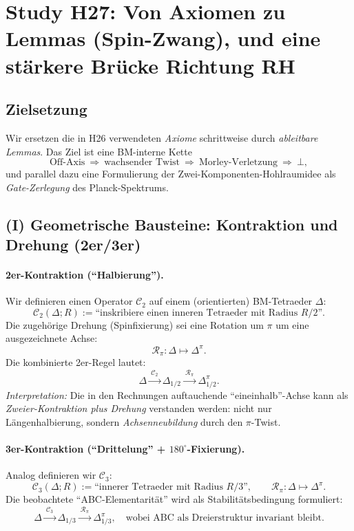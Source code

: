 

\section{Study H27: Von Axiomen zu Lemmas (Spin-Zwang), und eine st\"arkere Br\"ucke Richtung RH}

\subsection{Zielsetzung}
Wir ersetzen die in H26 verwendeten \emph{Axiome} schrittweise durch \emph{ableitbare Lemmas}.
Das Ziel ist eine BM-interne Kette
\[
\text{Off-Axis} \ \Rightarrow\ \text{wachsender Twist} \ \Rightarrow\ \text{Morley-Verletzung} \ \Rightarrow\ \bot,
\]
und parallel dazu eine Formulierung der Zwei-Komponenten-Hohlraumidee als \emph{Gate-Zerlegung} des Planck-Spektrums.

\subsection{(I) Geometrische Bausteine: Kontraktion und Drehung (2er/3er)}
\paragraph{2er-Kontraktion (``Halbierung'').}
Wir definieren einen Operator $\mathcal C_2$ auf einem (orientierten) BM-Tetraeder $\Delta$:
\[
\mathcal C_2(\Delta;R) := \text{``inskribiere einen inneren Tetraeder mit Radius }R/2\text{''}.
\]
Die zugeh\"orige Drehung (Spinfixierung) sei eine Rotation um $\pi$ um eine ausgezeichnete Achse:
\[
\mathcal R_\pi: \Delta \mapsto \Delta^\pi.
\]
Die kombinierte 2er-Regel lautet:
\[
\Delta \xrightarrow{\ \mathcal C_2\ }\Delta_{1/2}\xrightarrow{\ \mathcal R_\pi\ }\Delta_{1/2}^\pi.
\]
\emph{Interpretation:} Die in den Rechnungen auftauchende ``eineinhalb''-Achse kann als \emph{Zweier-Kontraktion plus Drehung}
verstanden werden: nicht nur L\"angenhalbierung, sondern \emph{Achsenneubildung} durch den $\pi$-Twist.

\paragraph{3er-Kontraktion (``Drittelung'' + $180^\circ$-Fixierung).}
Analog definieren wir $\mathcal C_3$:
\[
\mathcal C_3(\Delta;R):=\text{``innerer Tetraeder mit Radius }R/3\text{''},\qquad
\mathcal R_\pi: \Delta \mapsto \Delta^\pi.
\]
Die beobachtete ``ABC-Elementarit\"at'' wird als Stabilit\"atsbedingung formuliert:
\[
\Delta \xrightarrow{\ \mathcal C_3\ }\Delta_{1/3}\xrightarrow{\ \mathcal R_\pi\ }\Delta_{1/3}^\pi,
\quad \text{wobei ABC als Dreierstruktur invariant bleibt.}
\]

